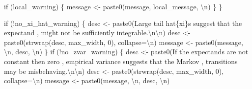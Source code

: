 \documentclass[
  letterpaper,
  DIV=11,
  numbers=noendperiod]{scrartcl}
\newenvironment{Shaded}{\begin{snugshade}}{\end{snugshade}}
\newcommand{\AttributeTok}[1]{\textcolor[rgb]{0.40,0.45,0.13}{#1}}
\newcommand{\ControlFlowTok}[1]{\textcolor[rgb]{0.00,0.23,0.31}{#1}}
\newcommand{\DecValTok}[1]{\textcolor[rgb]{0.68,0.00,0.00}{#1}}
\newcommand{\FunctionTok}[1]{\textcolor[rgb]{0.28,0.35,0.67}{#1}}
\newcommand{\NormalTok}[1]{\textcolor[rgb]{0.00,0.23,0.31}{#1}}
\newcommand{\OtherTok}[1]{\textcolor[rgb]{0.00,0.23,0.31}{#1}}
\newcommand{\SpecialCharTok}[1]{\textcolor[rgb]{0.37,0.37,0.37}{#1}}
\newcommand{\StringTok}[1]{\textcolor[rgb]{0.13,0.47,0.30}{#1}}
\begin{document}
\begin{Shaded}
\begin{Highlighting}[]
    \ControlFlowTok{if}\NormalTok{ (local\_warning) \{}
\NormalTok{      message }\OtherTok{\textless{}{-}} \FunctionTok{paste0}\NormalTok{(message, local\_message, }\StringTok{\textquotesingle{}}\SpecialCharTok{\textbackslash{}n}\StringTok{\textquotesingle{}}\NormalTok{)}
\NormalTok{    \}}
\NormalTok{  \}}

  \ControlFlowTok{if}\NormalTok{ (}\SpecialCharTok{!}\NormalTok{no\_xi\_hat\_warning) \{}
\NormalTok{    desc }\OtherTok{\textless{}{-}} \FunctionTok{paste0}\NormalTok{(}\StringTok{\textquotesingle{}Large tail hat\{xi\}s suggest that the expectand \textquotesingle{}}\NormalTok{,}
                   \StringTok{\textquotesingle{} might not be sufficiently integrable.}\SpecialCharTok{\textbackslash{}n\textbackslash{}n}\StringTok{\textquotesingle{}}\NormalTok{)}
\NormalTok{    desc }\OtherTok{\textless{}{-}} \FunctionTok{paste0}\NormalTok{(}\FunctionTok{strwrap}\NormalTok{(desc, max\_width, }\DecValTok{0}\NormalTok{), }\AttributeTok{collapse=}\StringTok{\textquotesingle{}}\SpecialCharTok{\textbackslash{}n}\StringTok{\textquotesingle{}}\NormalTok{)}
\NormalTok{    message }\OtherTok{\textless{}{-}} \FunctionTok{paste0}\NormalTok{(message, }\StringTok{\textquotesingle{}}\SpecialCharTok{\textbackslash{}n}\StringTok{\textquotesingle{}}\NormalTok{, desc, }\StringTok{\textquotesingle{}}\SpecialCharTok{\textbackslash{}n}\StringTok{\textquotesingle{}}\NormalTok{)}
\NormalTok{  \}}
  \ControlFlowTok{if}\NormalTok{ (}\SpecialCharTok{!}\NormalTok{no\_zvar\_warning) \{}
\NormalTok{    desc }\OtherTok{\textless{}{-}} \FunctionTok{paste0}\NormalTok{(}\StringTok{\textquotesingle{}If the expectands are not constant then zero \textquotesingle{}}\NormalTok{,}
                   \StringTok{\textquotesingle{}empirical variance suggests that the Markov \textquotesingle{}}\NormalTok{,}
                   \StringTok{\textquotesingle{}transitions may be misbehaving.}\SpecialCharTok{\textbackslash{}n\textbackslash{}n}\StringTok{\textquotesingle{}}\NormalTok{)}
\NormalTok{    desc }\OtherTok{\textless{}{-}} \FunctionTok{paste0}\NormalTok{(}\FunctionTok{strwrap}\NormalTok{(desc, max\_width, }\DecValTok{0}\NormalTok{), }\AttributeTok{collapse=}\StringTok{\textquotesingle{}}\SpecialCharTok{\textbackslash{}n}\StringTok{\textquotesingle{}}\NormalTok{)}
\NormalTok{    message }\OtherTok{\textless{}{-}} \FunctionTok{paste0}\NormalTok{(message, }\StringTok{\textquotesingle{}}\SpecialCharTok{\textbackslash{}n}\StringTok{\textquotesingle{}}\NormalTok{, desc, }\StringTok{\textquotesingle{}}\SpecialCharTok{\textbackslash{}n}\StringTok{\textquotesingle{}}\NormalTok{)}

\end{Highlighting}
\end{Shaded}
\end{document}

